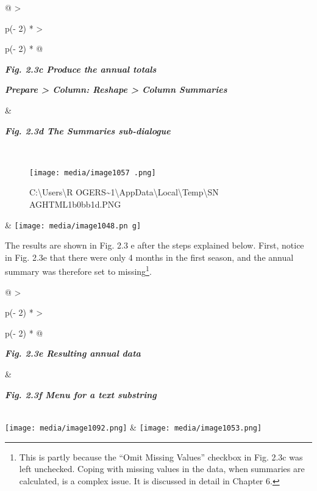 \documentclass[
  letterpaper,
  DIV=11,
  numbers=noendperiod]{scrreprt}
\begin{document}
\begin{longtable}[]{@{}
  >{\raggedright\arraybackslash}p{(\columnwidth - 2\tabcolsep) * }
  >{\raggedright\arraybackslash}p{(\columnwidth - 2\tabcolsep) * }@{}}
\toprule\noalign{}
\begin{minipage}[b]{\linewidth}\raggedright
\textbf{\emph{Fig. 2.3c Produce the annual totals}}

\textbf{\emph{Prepare \textgreater{} Column: Reshape \textgreater{}
Column Summaries}}
\end{minipage} & \begin{minipage}[b]{\linewidth}\raggedright
\textbf{\emph{Fig. 2.3d The Summaries sub-dialogue}}
\end{minipage} \\
\midrule\noalign{}
\endhead
\bottomrule\noalign{}
\endlastfoot
\begin{minipage}[t]{\linewidth}\raggedright
\begin{figure}[H]

{\centering \texttt{[image: media/image1057 .png]}

}

\caption{C:\textbackslash Users\textbackslash R
OGERS\textasciitilde1\textbackslash AppData\textbackslash Local\textbackslash Temp\textbackslash SN
AGHTML1b0bb1d.PNG}

\end{figure}%
\end{minipage} &
\texttt{[image: media/image1048.pn g]} \\
\end{longtable}

The results are shown in Fig. 2.3 e after the steps explained below.
First, notice in Fig. 2.3e that there were only 4 months in the first
season, and the annual summary was therefore set to missing\footnote{This
  is partly because the ``Omit Missing Values'' checkbox in Fig. 2.3c
  was left unchecked. Coping with missing values in the data, when
  summaries are calculated, is a complex issue. It is discussed in
  detail in Chapter 6.}.

\begin{longtable}[]{@{}
  >{\raggedright\arraybackslash}p{(\columnwidth - 2\tabcolsep) * }
  >{\raggedright\arraybackslash}p{(\columnwidth - 2\tabcolsep) * }@{}}
\toprule\noalign{}
\begin{minipage}[b]{\linewidth}\raggedright
\textbf{\emph{Fig. 2.3e Resulting annual data}}
\end{minipage} & \begin{minipage}[b]{\linewidth}\raggedright
\textbf{\emph{Fig. 2.3f Menu for a text substring}}
\end{minipage} \\
\midrule\noalign{}
\endhead
\bottomrule\noalign{}
\endlastfoot
\texttt{[image: media/image1092.png]}
&
\texttt{[image: media/image1053.png]} \\
\end{longtable}
\end{document}
